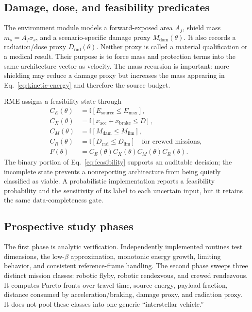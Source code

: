 \documentclass[conference]{../../../../Conference-LaTeX-template_10-17-19/IEEEtran}
\begin{document}
\subsection{Damage, dose, and feasibility predicates}
The environment module models a forward-exposed area $A_f$, shield mass $m_s=A_f\sigma_s$, and a scenario-specific damage proxy $M_{\mathrm{dam}}(\theta)$. It also records a radiation/dose proxy $D_{\mathrm{rad}}(\theta)$. Neither proxy is called a material qualification or a medical result. Their purpose is to force mass and protection terms into the same architecture vector as velocity. The mass recursion is important: more shielding may reduce a damage proxy but increases the mass appearing in Eq.~\eqref{eq:kinetic-energy} and therefore the source budget.

RME assigns a feasibility state through
\begin{align}
C_E(\theta) &= \mathbb{I}\!\left[E_{\mathrm{source}}\leq E_{\max}\right], \nonumber\\
C_X(\theta) &= \mathbb{I}\!\left[x_{\mathrm{acc}}+x_{\mathrm{brake}}\leq D\right], \nonumber\\
C_M(\theta) &= \mathbb{I}\!\left[M_{\mathrm{dam}}\leq M_{\lim}\right], \nonumber\\
C_R(\theta) &= \mathbb{I}\!\left[D_{\mathrm{rad}}\leq D_{\lim}\right]\quad\text{for crewed missions}, \nonumber\\
F(\theta) &= C_E(\theta)C_X(\theta)C_M(\theta)C_R(\theta).
\label{eq:feasibility}
\end{align}
The binary portion of Eq.~\eqref{eq:feasibility} supports an auditable decision; the incomplete state prevents a nonreporting architecture from being quietly classified as viable. A probabilistic implementation reports a feasibility probability and the sensitivity of its label to each uncertain input, but it retains the same data-completeness gate.

\subsection{Prospective study phases}
The first phase is analytic verification. Independently implemented routines test dimensions, the low-$\beta$ approximation, monotonic energy growth, limiting behavior, and consistent reference-frame handling. The second phase sweeps three distinct mission classes: robotic flyby, robotic rendezvous, and crewed rendezvous. It computes Pareto fronts over travel time, source energy, payload fraction, distance consumed by acceleration/braking, damage proxy, and radiation proxy. It does not pool these classes into one generic ``interstellar vehicle.''
\end{document}
